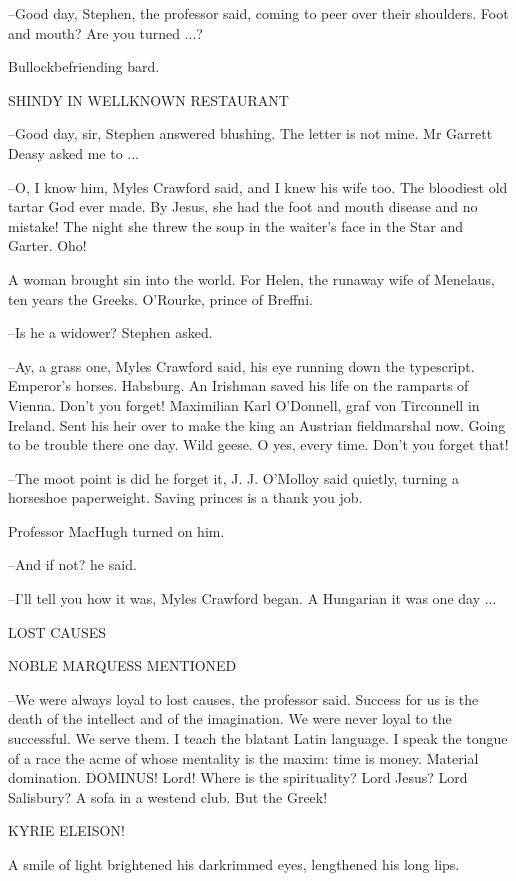 --Good day, Stephen, the professor said, coming to peer over their
shoulders. Foot and mouth? Are you turned ...?

Bullockbefriending bard.


    SHINDY IN WELLKNOWN RESTAURANT


--Good day, sir, Stephen answered blushing. The letter is not mine. Mr
Garrett Deasy asked me to ...

--O, I know him, Myles Crawford said, and I knew his wife too. The
bloodiest old tartar God ever made. By Jesus, she had the foot and mouth
disease and no mistake! The night she threw the soup in the waiter's face
in the Star and Garter. Oho!

A woman brought sin into the world. For Helen, the runaway wife of
Menelaus, ten years the Greeks. O'Rourke, prince of Breffni.

--Is he a widower? Stephen asked.

--Ay, a grass one, Myles Crawford said, his eye running down the
typescript. Emperor's horses. Habsburg. An Irishman saved his life on the
ramparts of Vienna. Don't you forget! Maximilian Karl O'Donnell, graf
von Tirconnell in Ireland. Sent his heir over to make the king an Austrian
fieldmarshal now. Going to be trouble there one day. Wild geese. O yes,
every time. Don't you forget that!

--The moot point is did he forget it, J. J. O'Molloy said quietly,
turning a horseshoe paperweight. Saving princes is a thank you job.

Professor MacHugh turned on him.

--And if not? he said.

--I'll tell you how it was, Myles Crawford began. A Hungarian it was one
day ...


    LOST CAUSES


    NOBLE MARQUESS MENTIONED


--We were always loyal to lost causes, the professor said. Success for us
is the death of the intellect and of the imagination. We were never loyal
to the successful. We serve them. I teach the blatant Latin language. I
speak the tongue of a race the acme of whose mentality is the maxim: time
is money. Material domination. DOMINUS! Lord! Where is the spirituality?
Lord Jesus? Lord Salisbury? A sofa in a westend club. But the Greek!


    KYRIE ELEISON!


A smile of light brightened his darkrimmed eyes, lengthened his long
lips.

